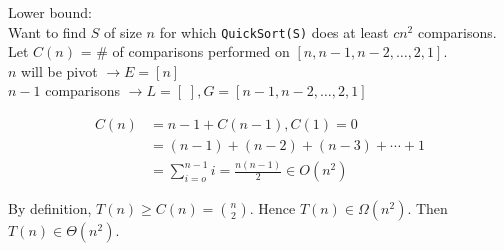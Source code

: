 \noindent Lower bound: \\
Want to find $S$ of size $n$ for which \texttt{QuickSort(S)} does at least $cn^2$ comparisons. \\
Let $C(n)$ = \# of comparisons performed on $[n,n-1,n-2,\ldots,2,1]$. \\
$n$ will be pivot $\rightarrow E = [n]$ \\
$n-1$ comparisons $\rightarrow L = [\;], G = [n-1,n-2,\ldots,2,1]$ 

\begin{equation*}
\begin{split}
C(n) & = n-1 + C(n-1), C(1) = 0 \\
& = (n-1)+(n-2)+(n-3)+\cdots+1 \\
& = \sum_{i=o}^{n-1} i = \frac{n(n-1)}{2} \in O(n^2)
\end{split}
\end{equation*}

\noindent By definition, $T(n) \geq C(n) = {n \choose 2}$. Hence $T(n) \in \Omega(n^2)$. Then $T(n) \in \Theta(n^2)$.

